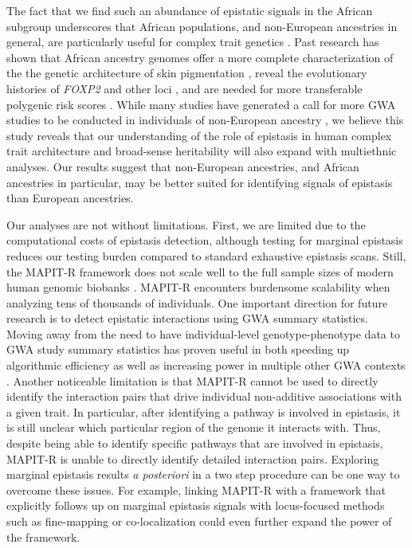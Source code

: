 \documentclass[10pt]{article}
\begin{document}
The fact that we find such an abundance of epistatic signals in the African subgroup underscores that African populations, and non-European ancestries in general, are particularly useful for complex trait genetics \cite{Dumitrescu2011,Rotimi2017,Choudhury2018,Martin2018,Mogil2018,Bien2019,Kuchenbaecker2019,Wojcik2019,Zhong2019,Bentley2020}. Past research has shown that African ancestry genomes offer a more complete characterization of the the genetic architecture of skin pigmentation \cite{Martin2017b,Crawford2017b}, reveal the evolutionary histories of \textit{FOXP2} and other loci \cite{Atkinson2018,Sugden2018}, and are needed for more transferable polygenic risk scores \cite{Duncan2019,Marnetto2020}. While many studies have generated a call for more GWA studies to be conducted in individuals of non-European ancestry  \cite{Need2009,Popejoy2016,Gurdasani2019,Martin2019,Sirugo2019}, we believe this study reveals that our understanding of the role of epistasis in human complex trait architecture and broad-sense heritability will also expand with multiethnic analyses. Our results suggest that non-European ancestries, and African ancestries in particular, may be better suited for identifying signals of epistasis than European ancestries. 

Our analyses are not without limitations. First, we are limited due to the computational costs of epistasis detection, although testing for marginal epistasis reduces our testing burden compared to standard exhaustive epistasis scans. Still, the MAPIT-R framework does not scale well to the full sample sizes of modern human genomic biobanks \cite{Crawford2017a,Crawford2018a,Moore2019}. MAPIT-R encounters burdensome scalability when analyzing tens of thousands of individuals. One important direction for future research is to detect epistatic interactions using GWA summary statistics. Moving away from the need to have individual-level genotype-phenotype data to GWA study summary statistics has proven useful in both speeding up algorithmic efficiency as well as increasing power in multiple other GWA contexts \cite{Shi2016,Johnson2018,Ray2018,Turchin2019,Urbut2019,Cheng2020}. Another noticeable limitation is that MAPIT-R cannot be used to directly identify the interaction pairs that drive individual non-additive associations with a given trait. In particular, after identifying a pathway is involved in epistasis, it is still unclear which particular region of the genome it interacts with. Thus, despite being able to identify specific pathways that are involved in epistasis, MAPIT-R is unable to directly identify detailed interaction pairs. Exploring marginal epistasis results \textit{a posteriori} in a two step procedure can be one way to overcome these issues. For example, linking MAPIT-R with a framework that explicitly follows up on marginal epistasis signals with locus-focused methods such as fine-mapping \cite{Kichaev2014,Chen2015,Benner2016} or co-localization \cite{Hormozdiari2016,Zhu2016,Wen2017,Giambartolomei2018,Wallace2020} could even further expand the power of the framework. 
\end{document}
